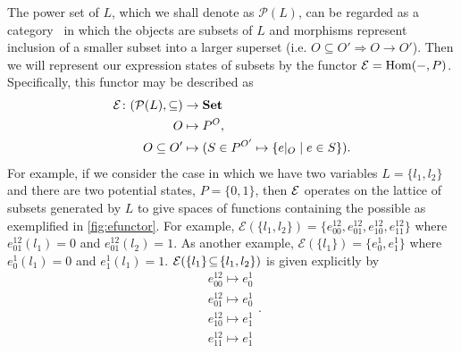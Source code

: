 The power set of $L$, which we shall denote as $\mathcal{P}(L)$, can be regarded  as a category~\cite{Lane1998,MacLane1992,Awodey2006,Abramsky2011} in which the objects are subsets of $L$ and morphisms represent inclusion of a smaller subset into a larger superset (i.e. $O \subseteq O' \Rightarrow O \rightarrow O'$).  Then we will represent our expression states of subsets by the functor $\mathcal{E} = \mathrm{Hom}(-,P)$.  Specifically, this functor may be described as
\begin{equation}\label{eq:gpfunctor}
\begin{split}
\expr \colon (\mathcal{P}(L), \subseteq) &\to \mathbf{Set} \\
O &\mapsto P^O,\\
O \subseteq O' &\mapsto (S \in P^{O'} \mapsto \{e|_O \mid e \in S\}). %
\end{split}
\end{equation}
For example, if we consider the case in which we have two variables $L=\{l_1,l_2\}$ and there are two potential states, $P=\{0,1\}$, then $\mathcal{E}$ operates on the lattice of subsets generated by $L$ to give spaces of functions containing the possible \gnpm{} as exemplified in \autoref{fig:efunctor}.
For example, $\mathcal{E}(\{l_1,l_2\}) = \{ e^{12}_{00},e^{12}_{01},e^{12}_{10},e^{12}_{11} \}$ where $e^{12}_{01}(l_1) = 0$ and $e^{12}_{01}(l_2) = 1$. As another example, $\mathcal{E}(\{l_1\}) = \{ e^{1}_{0},e^{1}_{1} \}$ where $e^{1}_{0}(l_1)=0$ and $e^{1}_{1}(l_1)=1$. $\mathcal{E} ( \{ l_1 \} \! \subseteq \! \{ l_1, l_2 \} )$ is given explicitly by
\begin{equation}
\begin{aligned}
e^{12}_{00} \mapsto e^{1}_{0}\\
e^{12}_{01} \mapsto e^{1}_{0}\\
e^{12}_{10} \mapsto e^{1}_{1}\\
e^{12}_{11} \mapsto e^{1}_{1}
\end{aligned}.
\end{equation}

